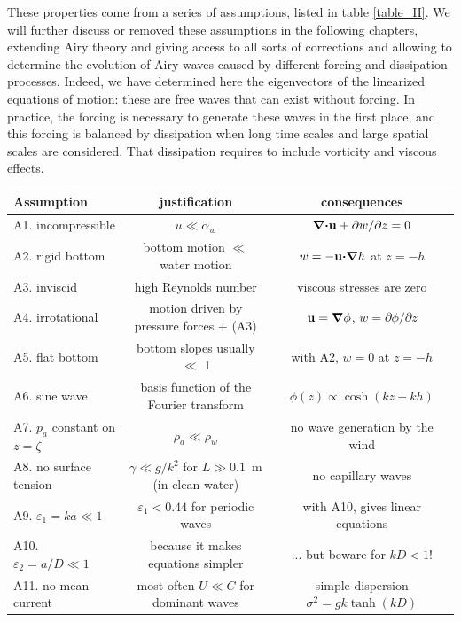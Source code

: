 These properties come from a series of assumptions, listed in table \ref{table_H}. We will further discuss or removed these assumptions in 
the following chapters, extending Airy theory and giving access to all sorts of corrections and allowing to determine the 
evolution of Airy waves caused by different forcing and dissipation processes. Indeed, we have determined here the 
eigenvectors of the linearized equations of motion: these are free waves that can exist without forcing. In practice, the forcing 
is necessary to generate these waves in the first place, and this forcing is balanced by dissipation when long time scales and large 
spatial scales are considered. That dissipation requires to include vorticity and viscous effects. 
\begin{table}
  \centering
  \begin{tabular}{lcc}
\hline
 Assumption          & justification                                  & consequences  \\
\hline
 A1. incompressible &   $u \ll \alpha_w $             & $\mbox{\boldmath $\nabla$} \mbox{\boldmath $\cdot$} \mathbf{u} + \partial w/\partial z=0$ \\
 A2. rigid bottom   & bottom motion $\ll$ water motion & $w=-\mathbf{u} \mbox{\boldmath $\cdot$} \mbox{\boldmath $\nabla$} h$ at $z=-h$ \\
 A3. inviscid       & high Reynolds number                    & viscous stresses are zero \\
 A4. irrotational   & motion driven by pressure forces + (A3)   & $\mathbf{u}=\mbox{\boldmath $\nabla$} \phi$, $w=\partial \phi/\partial z$\\
 A5. flat bottom    & bottom slopes usually $\ll$ 1 & with A2, $w=0$ at $z=-h$ \\
 A6. sine wave      & basis function of the Fourier transform & $\phi(z) \propto
 \cosh(kz+kh)$ \\
 A7. $p_a$ constant on $z=\zeta$ & $\rho_a \ll \rho_w$         &  no wave generation by the wind \\
 A8. no surface tension & $\gamma \ll g/k^2$ for $L \gg 0.1$~m (in clean water) & no capillary waves \\
 A9. $\varepsilon_1=ka \ll 1$ & $\varepsilon_1 <0.44$ for periodic waves & with A10, gives linear equations \\
 A10. $\varepsilon_2=a/D \ll 1$ & because it makes equations simpler & ... but beware for  $kD < 1$! \\
 A11. no mean current & most often $U \ll C$  for dominant waves & simple dispersion  $\sigma^2 = gk \tanh(kD)$ \\

\end{tabular}
\end{table}
